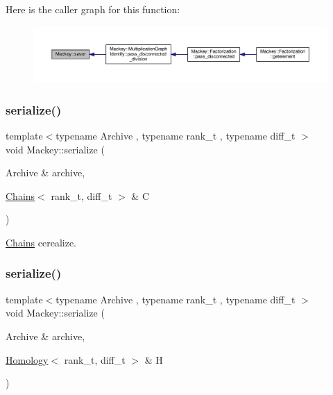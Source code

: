 Here is the caller graph for this function\+:\nopagebreak
\begin{figure}[H]
\begin{center}
\leavevmode
\includegraphics[width=350pt]{namespaceMackey_a1824d780ce15f1845e4f87bf056feec9_icgraph}
\end{center}
\end{figure}
\mbox{\label{namespaceMackey_a43cf712cb611ddbafa91b005a911436e}} 
\subsubsection{\texorpdfstring{serialize()}{serialize()}\hspace{0.1cm}{\footnotesize\ttfamily [1/7]}}
{\footnotesize\ttfamily template$<$typename Archive , typename rank\+\_\+t , typename diff\+\_\+t $>$ \\
void Mackey\+::serialize (\begin{DoxyParamCaption}\item[{Archive \&}]{archive,  }\item[{\hyperlink{classMackey_1_1Chains}{Chains}$<$ rank\+\_\+t, diff\+\_\+t $>$ \&}]{C }\end{DoxyParamCaption})}



\hyperlink{classMackey_1_1Chains}{Chains} cerealize. 

\mbox{\label{namespaceMackey_a1cb51476ba1b1022264da5ba324b73f5}} 
\subsubsection{\texorpdfstring{serialize()}{serialize()}\hspace{0.1cm}{\footnotesize\ttfamily [2/7]}}
{\footnotesize\ttfamily template$<$typename Archive , typename rank\+\_\+t , typename diff\+\_\+t $>$ \\
void Mackey\+::serialize (\begin{DoxyParamCaption}\item[{Archive \&}]{archive,  }\item[{\hyperlink{classMackey_1_1Homology}{Homology}$<$ rank\+\_\+t, diff\+\_\+t $>$ \&}]{H }\end{DoxyParamCaption})}



